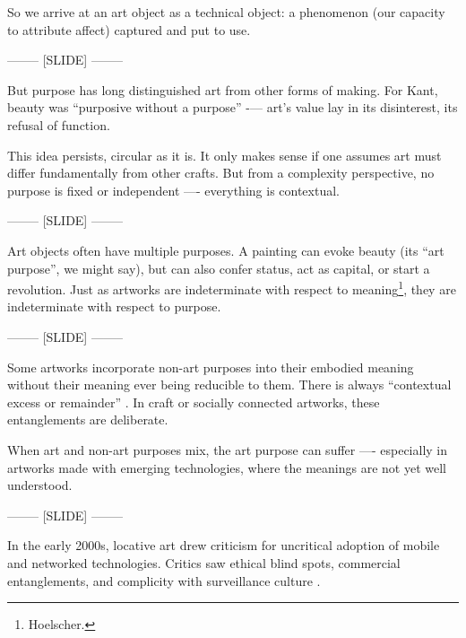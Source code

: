 \documentclass[letter:wpaper]{article}
\begin{document}
    So we arrive at an art object as a technical object: a phenomenon (our capacity to attribute affect) captured and put to use.

    -------- [SLIDE] --------

    But purpose has long distinguished art from other forms of making. For Kant, beauty was ``purposive without a purpose'' \citep[p.57]{KantCrtqOfJdgmnt} -— art’s value lay in its disinterest, its refusal of function.

    This idea persists, circular as it is. It only makes sense if one assumes art must differ fundamentally from other crafts. But from a complexity perspective, no purpose is fixed or independent —- everything is contextual.

    -------- [SLIDE] --------

    Art objects often have multiple purposes. A painting can evoke beauty (its ``art purpose'', we might say), but can also confer status, act as capital, or start a revolution. Just as artworks are indeterminate with respect to meaning\footnote{
        Hoelscher.
    }, they are indeterminate with respect to purpose.

    -------- [SLIDE] --------

    Some artworks incorporate non-art purposes into their embodied meaning without their meaning ever being reducible to them. There is always ``contextual excess or remainder'' \citep[p.252]{MassumiPrblsFrThVrtl2002}. In craft or socially connected artworks, these entanglements are deliberate.

    When art and non-art purposes mix, the art purpose can suffer —- especially in artworks made with emerging technologies, where the meanings are not yet well understood.

    -------- [SLIDE] --------


    In the early 2000s, locative art drew criticism for uncritical adoption of mobile and networked technologies. Critics saw ethical blind spots, commercial entanglements, and complicity with surveillance culture \citep[p.358]{beyondLocativeMedia2006} \citep[para. 2]{questioningTheFrame2004}.
\end{document}
